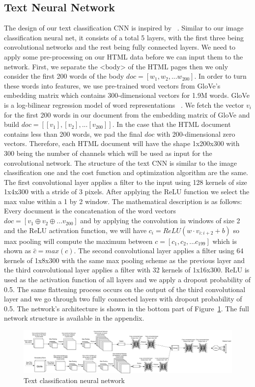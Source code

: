 \documentclass{article} %
\begin{document}
\subsection{Text Neural Network}
The design of our text classification CNN is inspired by ~\cite{convtext}. Similar to our image classification neural net, it consists of a total 5 layers, with the first three being convolutional networks and the rest being fully connected layers. We need to apply some pre-processing on our HTML data before we can input them to the network. First, we separate the <body> of the HTML pages then we only consider the first 200 words of the body $doc=[w_1,w_2,...w_{200}]$. In order to turn these words into features, we use pre-trained word vectors from GloVe's embedding matrix which contains 300-dimensional vectors for 1.9M words. GloVe is a log-bilinear regression model of word representations ~\cite{glove}. We fetch the vector $v_i$ for the first 200 words in our document from the embedding matrix of GloVe and build $doc = [[v_1],[v_2],...[v_{200}]]$. In the case that the HTML document contains less than 200 words, we pad the final $doc$ with 200-dimensional zero vectors. Therefore, each HTML document will have the shape 1x200x300 with 300 being the number of channels which will be used as input for the convolutional network. The structure of the text CNN is similar to the image classification one and the cost function and optimization algorithm are the same. The first convolutional layer applies a filter to the input using 128 kernels of size 1x4x300 with a stride of 3 pixels. After applying the ReLU function we select the max value within a 1 by 2 window. The mathematical description is as follows:
Every document is the concatenation of the word vectors $doc = [v_1 \oplus v_2 \oplus ... v_{200}]$ and by applying the convolution in windows of size 2 and the ReLU activation function, we will have $c_i = ReLU(w\cdot v_{i:i+2} +b)$ so max pooling will compute the maximum between $c = [c_1, c_2, ... c_{199}]$ which is shown as $\hat{c} = max(c)$.
The second convolutional layer applies a filter using 64 kernels of 1x8x300 with the same max pooling scheme as the previous layer and the third convolutional layer applies a filter with 32 kernels of 1x16x300. ReLU is used as the activation function of all layers and we apply a dropout probability of 0.5. The same flattening process occurs on the output of the third convolutional layer and we go through two fully connected layers with dropout probability of 0.5. The network's architecture is shown in the bottom part of Figure~\ref{fig:cnn}. The full network structure is available in the appendix.
\begin{figure}
\centering
        \includegraphics[totalheight=3.5cm]{Combined}
    \caption{Text classification neural network}
    \label{fig:cnn}
\end{figure}
\end{document}
